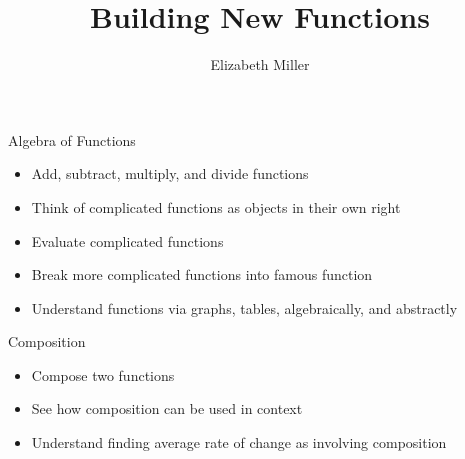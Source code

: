 \documentclass{ximera}
\author{Elizabeth Miller}
\title{Building New Functions}
\begin{document}
\begin{abstract}
\end{abstract}
\maketitle


\begin{objectives}

\item Algebra of Functions
\begin{itemize}
	\item Add, subtract, multiply, and divide functions 
	\item Think of complicated functions as objects in their own right 
	\item Evaluate complicated functions 
	\item Break more complicated functions into famous function %
	\item Understand functions via graphs, tables, algebraically, and abstractly 
\end{itemize}


\item Composition
\begin{itemize}
	\item Compose two functions
	\item See how composition can be used in context
	\item Understand finding average rate of change as involving composition

\end{itemize}

\end{objectives}
\end{document}
